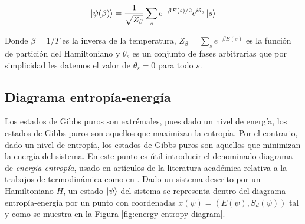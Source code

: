 \begin{equation}
    \ket{\psi(\beta)}=\frac{1}{\sqrt{Z_\beta}}\sum_s e^{-\beta E(s)/2} e^{i\theta_s}\ket{s}
    \label{eq:gibbs_states}
\end{equation}

Donde $\beta=1/T$ es la inversa de la temperatura, 
$Z_\beta=\sum_{s} e^{-\beta E(s)}$ es la función de partición del Hamiltoniano y
$\theta_s$ es un conjunto de fases arbitrarias que por simplicidad les datemos el valor de $\theta_s=0$ para todo $s$.

\subsection{Diagrama entropía-energía}

Los estados de Gibbs puros son extrémales, pues dado un nivel de energía, los estados de Gibbs puros son aquellos que maximizan la entropía. Por el contrario, dado un nivel de entropía, los estados de Gibbs puros son aquellos que minimizan la energía del sistema. En este punto es útil introducir el denominado diagrama de \textit{energía-entropía}, usado en artículos de la literatura académica relativa a la trabajos de termodinámica como en \cite{riera}. Dado un sistema descrito por un Hamiltoniano $H$, un estado $\ket{\psi}$ del sistema se representa dentro del diagrama entropía-energía por un punto con coordenadas \mbox{$x(\psi) = (E(\psi), S_{d}(\psi))$} tal y como se muestra en la Figura \ref{fig:energy-entropy-diagram}.


